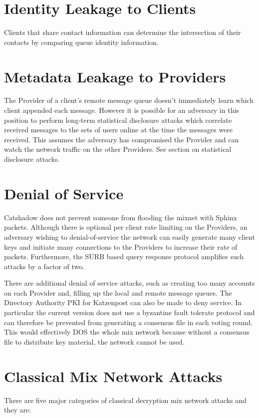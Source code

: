\documentclass[conference]{IEEEtran}
\begin{document}
\section{Identity Leakage to Clients}
Clients that share contact information can determine the intersection
of their contacts by comparing queue identity information.

\section{Metadata Leakage to Providers}
The Provider of a client's remote message queue doesn't immediately
learn which client appended each message. However it is possible for
an adversary in this position to perform long-term statistical
disclosure attacks which correlate received messages to the sets of
users online at the time the messages were received. This assumes the
adversary has compromised the Provider and can watch the network
traffic on the other Providers. See section on statistical disclosure
attacks.

\section{Denial of Service}
Catshadow does not prevent someone from flooding the mixnet with
Sphinx packets. Although there is optional per client rate limiting on
the Providers, an adversary wishing to denial-of-service the network
can easily generate many client keys and initiate many connections to
the Providers to increase their rate of packets. Furthermore, the SURB
based query response protocol amplifies such attacks by a factor of
two.

There are additional denial of service attacks, such as creating too
many accounts on each Provider and, filling up the local and remote
message queues. The Directory Authority PKI for Katzenpost
\cite{KatzMixPKI} can also be made to deny service. In particular the
current version does not use a byzantine fault tolerate protocol and
can therefore be prevented from generating a consensus file in each
voting round.  This would effectively DOS the whole mix network
because without a consensus file to distribute key material, the
network cannot be used.

\section{Classical Mix Network Attacks}
There are five major categories of classical decryption mix network attacks
and they are:
\end{document}
